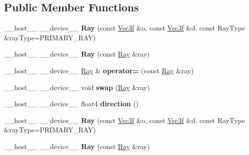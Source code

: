 \subsection*{Public Member Functions}
\begin{DoxyCompactItemize}
\item 
\+\_\+\+\_\+host\+\_\+\+\_\+ \+\_\+\+\_\+device\+\_\+\+\_\+ {\bfseries Ray} (const \hyperlink{class_vec3}{Vec3f} \&o, const \hyperlink{class_vec3}{Vec3f} \&d, const Ray\+Type \&ray\+Type=P\+R\+I\+M\+A\+R\+Y\+\_\+\+R\+AY)\hypertarget{class_ray_a70dc24e77fd2f372f64481b84352ea79}{}\label{class_ray_a70dc24e77fd2f372f64481b84352ea79}

\item 
\+\_\+\+\_\+host\+\_\+\+\_\+ \+\_\+\+\_\+device\+\_\+\+\_\+ {\bfseries Ray} (const \hyperlink{class_ray}{Ray} \&ray)\hypertarget{class_ray_a6d8a9d6b5b86ab607f5713a88943095c}{}\label{class_ray_a6d8a9d6b5b86ab607f5713a88943095c}

\item 
\+\_\+\+\_\+host\+\_\+\+\_\+ \+\_\+\+\_\+device\+\_\+\+\_\+ \hyperlink{class_ray}{Ray} \& {\bfseries operator=} (const \hyperlink{class_ray}{Ray} \&ray)\hypertarget{class_ray_ae5f0c2eebb56ef7f3e4d43a49bfc94a7}{}\label{class_ray_ae5f0c2eebb56ef7f3e4d43a49bfc94a7}

\item 
\+\_\+\+\_\+host\+\_\+\+\_\+ \+\_\+\+\_\+device\+\_\+\+\_\+ void {\bfseries swap} (\hyperlink{class_ray}{Ray} \&ray)\hypertarget{class_ray_ac55e80131f5422dd969190ebb56a4be7}{}\label{class_ray_ac55e80131f5422dd969190ebb56a4be7}

\item 
\+\_\+\+\_\+host\+\_\+\+\_\+ \+\_\+\+\_\+device\+\_\+\+\_\+ float4 {\bfseries direction} ()\hypertarget{class_ray_afa09f7613e0f5e5e7e0d1093ea83df6b}{}\label{class_ray_afa09f7613e0f5e5e7e0d1093ea83df6b}

\item 
\+\_\+\+\_\+host\+\_\+\+\_\+ \+\_\+\+\_\+device\+\_\+\+\_\+ {\bfseries Ray} (const \hyperlink{class_vec3}{Vec3f} \&o, const \hyperlink{class_vec3}{Vec3f} \&d, const Ray\+Type \&ray\+Type=P\+R\+I\+M\+A\+R\+Y\+\_\+\+R\+AY)\hypertarget{class_ray_a70dc24e77fd2f372f64481b84352ea79}{}\label{class_ray_a70dc24e77fd2f372f64481b84352ea79}

\item 
\+\_\+\+\_\+host\+\_\+\+\_\+ \+\_\+\+\_\+device\+\_\+\+\_\+ {\bfseries Ray} (const \hyperlink{class_ray}{Ray} \&ray)\hypertarget{class_ray_a6d8a9d6b5b86ab607f5713a88943095c}{}\label{class_ray_a6d8a9d6b5b86ab607f5713a88943095c}


\end{DoxyCompactItemize}
